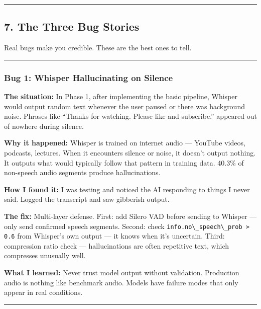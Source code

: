 \documentclass[
  11pt,
]{article}
\newcommand{\passthrough}[1]{#1}
\begin{document}
\begin{center}\rule{0.5\linewidth}{0.5pt}\end{center}

\hypertarget{the-three-bug-stories}{%
\subsection{7. The Three Bug Stories}\label{the-three-bug-stories}}

Real bugs make you credible. These are the best ones to tell.

\begin{center}\rule{0.5\linewidth}{0.5pt}\end{center}

\hypertarget{bug-1-whisper-hallucinating-on-silence}{%
\subsubsection{Bug 1: Whisper Hallucinating on
Silence}\label{bug-1-whisper-hallucinating-on-silence}}

\textbf{The situation:} In Phase 1, after implementing the basic
pipeline, Whisper would output random text whenever the user paused or
there was background noise. Phrases like ``Thanks for watching. Please
like and subscribe.'' appeared out of nowhere during silence.

\textbf{Why it happened:} Whisper is trained on internet audio ---
YouTube videos, podcasts, lectures. When it encounters silence or noise,
it doesn't output nothing. It outputs what would typically follow that
pattern in training data. 40.3\% of non-speech audio segments produce
hallucinations.

\textbf{How I found it:} I was testing and noticed the AI responding to
things I never said. Logged the transcript and saw gibberish output.

\textbf{The fix:} Multi-layer defense. First: add Silero VAD before
sending to Whisper --- only send confirmed speech segments. Second:
check \passthrough{\lstinline!info.no\_speech\_prob > 0.6!} from
Whisper's own output --- it knows when it's uncertain. Third:
compression ratio check --- hallucinations are often repetitive text,
which compresses unusually well.

\textbf{What I learned:} Never trust model output without validation.
Production audio is nothing like benchmark audio. Models have failure
modes that only appear in real conditions.

\begin{center}\rule{0.5\linewidth}{0.5pt}\end{center}
\end{document}
